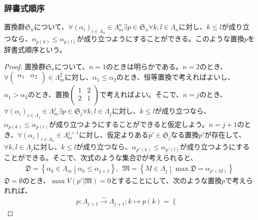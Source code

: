 \documentclass[dvipdfmx]{jsarticle}
\begin{document}
\subsubsection{辞書式順序}%
\begin{thm}\label{2.1.10.9}
置換群$\mathfrak{S}_{n}$について、$\forall\left( \alpha_{i} \right)_{i \in \varLambda_{n}} \in \varLambda_{m}^{n}\exists p \in \mathfrak{S}_{n}\forall k,l \in \varLambda_{n}$に対し、$k \leq l$が成り立つなら、$\alpha_{p(k)} \leq \alpha_{p(l)}$が成り立つようにすることができる。このような置換$p$を辞書式順序という。
\end{thm}
\begin{proof}
置換群$\mathfrak{S}_{n}$について、$n = 1$のときは明らかである。$n = 2$のとき、$\forall\begin{pmatrix}
\alpha_{1} & \alpha_{2} \\
\end{pmatrix} \in \varLambda_{m}^{2}$に対し、$\alpha_{1} \leq \alpha_{2}$のとき、恒等置換で考えればよいし、$\alpha_{1} > \alpha_{2}$のとき、置換$\begin{pmatrix}
1 & 2 \\
2 & 1 \\
\end{pmatrix}$で考えればよい。そこで、$n = j$のとき、$\forall\left( \alpha_{i} \right)_{i \in \varLambda_{j}} \in \varLambda_{m}^{j}\exists p \in \mathfrak{S}_{j}\forall k,l \in \varLambda_{j}$に対し、$k \leq l$が成り立つなら、$\alpha_{p(k)} \leq \alpha_{p(l)}$が成り立つようにすることができると仮定しよう。$n = j + 1$のとき、$\forall\left( \alpha_{i} \right)_{i \in \varLambda_{n}} \in \varLambda_{m}^{j + 1}$に対し、仮定よりある$p' \in \mathfrak{S}_{j}$なる置換$p'$が存在して、$\forall k,l \in \varLambda_{j}$に対し、$k \leq l$が成り立つなら、$\alpha_{p'(k)} \leq \alpha_{p'(l)}$が成り立つようにすることができる。そこで、次式のような集合$\mathfrak{D}$が考えられると、
\begin{align*}
\mathfrak{D}=\left\{ \alpha_{k} \in \varLambda_{m} \middle| \alpha_{k} \leq \alpha_{j + 1} \right\},\ \ \mathfrak{M}=\left\{ M \in \varLambda_{j} \middle| \max\mathfrak{D} = \alpha_{p'(M)} \right\}
\end{align*}
$\mathfrak{D} = \emptyset$のとき、$\max{V\left( p'\mathfrak{|M} \right)} = 0$とすることにして、次のような置換$p$で考えられれば、
\begin{align*}
p:\varLambda_{j + 1}\overset{\sim}{\rightarrow}\varLambda_{j + 1};k \mapsto p(k) = \left\{ \begin{matrix}

\end{matrix}
\end{align*}
\end{proof}
\end{document}
